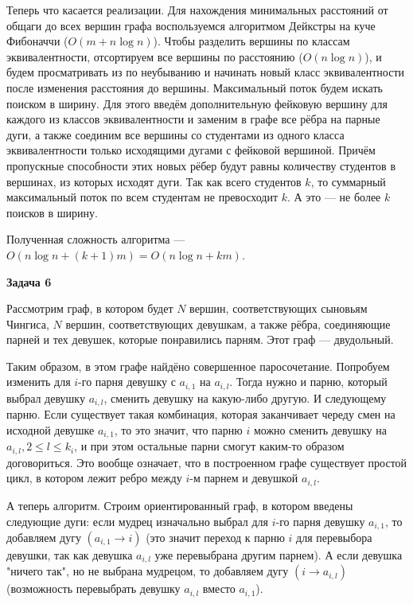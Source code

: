 \documentclass[12pt]{article}
\begin{document}
	Теперь что касается реализации. Для нахождения минимальных расстояний от общаги до всех вершин графа воспользуемся алгоритмом Дейкстры на куче Фибоначчи ($ O(m + n \log{n}) $). Чтобы разделить вершины по классам эквивалентности, отсортируем все вершины по расстоянию ($ O(n \log{n}) $), и будем просматривать из по неубыванию и начинать новый класс эквивалентности после изменения расстояния до вершины. Максимальный поток будем искать поиском в ширину. Для этого введём дополнительную фейковую вершину для каждого из классов эквивалентности и заменим в графе все рёбра на парные дуги, а также соединим все вершины со студентами из одного класса эквивалентности только исходящими дугами с фейковой вершиной. Причём пропускные способности этих новых рёбер будут равны количеству студентов в вершинах, из которых исходят дуги. Так как всего студентов $ k $, то суммарный максимальный поток по всем студентам не превосходит $ k $. А это --- не более $ k $ поисков в ширину.
	
	Полученная сложность алгоритма --- $ O(n \log{n} + (k + 1) m) = O(n \log{n} + km)$.
	\newline
	
	\textbf{\large Задача 6}
		
	Рассмотрим граф, в котором будет $ N $ вершин, соответствующих сыновьям Чингиса, $ N $ вершин, соответствующих девушкам, а также рёбра, соединяющие парней и тех девушек, которые понравились парням. Этот граф --- двудольный.
	
	Таким образом, в этом графе найдёно совершенное паросочетание. Попробуем изменить для $ i $-го парня девушку с $ a_{i, 1} $ на $ a_{i, l} $. Тогда нужно и парню, который выбрал девушку $ a_{i, l} $, сменить девушку на какую-либо другую. И следующему парню. Если существует такая комбинация, которая заканчивает череду смен на исходной девушке $ a_{i, 1} $, то это значит, что парню $ i $ можно сменить девушку на $ a_{i, l}, 2 \le l \le k_i $, и при этом остальные парни смогут каким-то образом договориться. Это вообще означает, что в построенном графе существует простой цикл, в котором лежит ребро между $ i $-м парнем и девушкой $ a_{i, l} $.
	\newline
	
	А теперь алгоритм. Строим ориентированный граф, в котором введены следующие дуги: если мудрец изначально выбрал для $ i $-го парня девушку $ a_{i, 1} $, то добавляем дугу $ (a_{i, 1} \rightarrow i) $ (это значит переход к парню $ i $ для перевыбора девушки, так как девушка $ a_{i, l} $ уже перевыбрана другим парнем). А если девушка "ничего так", но не выбрана мудрецом, то добавляем дугу $ (i \rightarrow a_{i, l}) $ (возможность перевыбрать девушку $ a_{i, l} $ вместо $ a_{i, 1} $).
	\newline
	
\end{document}
